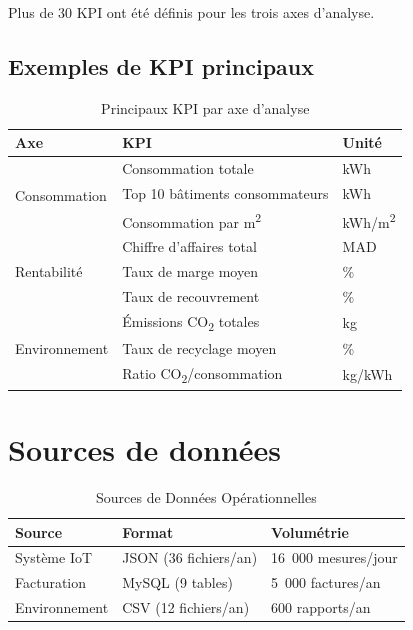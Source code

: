\documentclass[12pt,a4paper]{report}
\begin{document}
Plus de 30 KPI ont été définis pour les trois axes d'analyse.

\subsection{Exemples de KPI principaux}

\begin{table}[H]
\centering
\caption{Principaux KPI par axe d'analyse}
\label{tab:kpi_principaux}
\begin{tabular}{|l|l|l|}
\hline
\textbf{Axe} & \textbf{KPI} & \textbf{Unité} \\
\hline
\multirow{3}{*}{Consommation} & Consommation totale & kWh \\
 & Top 10 bâtiments consommateurs & kWh \\
 & Consommation par m\textsuperscript{2} & kWh/m\textsuperscript{2} \\
\hline
\multirow{3}{*}{Rentabilité} & Chiffre d'affaires total & MAD \\
 & Taux de marge moyen & \% \\
 & Taux de recouvrement & \% \\
\hline
\multirow{3}{*}{Environnement} & Émissions CO\textsubscript{2} totales & kg \\
 & Taux de recyclage moyen & \% \\
 & Ratio CO\textsubscript{2}/consommation & kg/kWh \\
\hline
\end{tabular}
\end{table}

\section{Sources de données}

\begin{table}[H]
\centering
\caption{Sources de Données Opérationnelles}
\label{tab:sources_donnees}
\begin{tabular}{|l|l|l|}
\hline
\textbf{Source} & \textbf{Format} & \textbf{Volumétrie} \\
\hline
Système IoT & JSON (36 fichiers/an) & 16~000 mesures/jour \\
\hline
Facturation & MySQL (9 tables) & 5~000 factures/an \\
\hline
Environnement & CSV (12 fichiers/an) & 600 rapports/an \\
\hline
\end{tabular}
\end{table}
\end{document}
